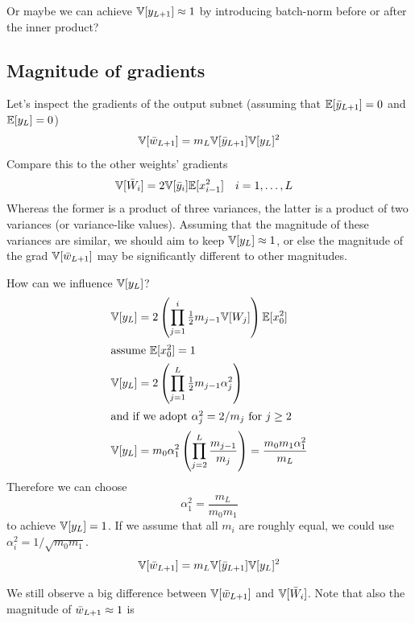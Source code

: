 Or maybe we can achieve $\mathbb{V}[y_{L+1}] \approx 1$ by introducing batch-norm before or after the inner product?


\clearpage

\subsection{Magnitude of gradients}

Let's inspect the gradients of the output subnet (assuming that $\mathbb{E}[\bar{y}_{L+1}] = 0$ and $\mathbb{E}[y_{L}] = 0$)
\begin{align}
\mathbb{V}[\bar{w}_{L+1}] = m_{L} \mathbb{V}[\bar{y}_{L+1}] \mathbb{V}[y_{L}]^{2}
\end{align}
Compare this to the other weights' gradients
\begin{align}
\mathbb{V}[\bar{W}_{i}] & = 2 \mathbb{V}[\bar{y}_{i}] \mathbb{E}[x_{i - 1}^2] && i = 1, \dots, L
\end{align}
Whereas the former is a product of three variances, the latter is a product of two variances (or variance-like values).
Assuming that the magnitude of these variances are similar, we should aim to keep $\mathbb{V}[y_{L}] \approx 1$, or else the magnitude of the grad $\mathbb{V}[\bar{w}_{L+1}]$ may be significantly different to other magnitudes.

How can we influence $\mathbb{V}[y_{L}]$?
\begin{align}
\mathbb{V}[y_{L}] & = 2 \left(\prod_{j = 1}^{i} \tfrac{1}{2} m_{j - 1} \mathbb{V}[W_{j}]\right) \mathbb{E}[x_{0}^2] \\
\intertext{assume $\mathbb{E}[x_{0}^2] = 1$}
\mathbb{V}[y_{L}] & = 2 \left(\prod_{j = 1}^{L} \tfrac{1}{2} m_{j - 1} \alpha_{j}^2\right) \\
\intertext{and if we adopt $\alpha_{j}^2 = 2/m_{j}$ for $j \ge 2$}
\mathbb{V}[y_{L}] & = m_{0} \alpha_{1}^2 \left(\prod_{j = 2}^{L} \frac{m_{j-1}}{m_{j}} \right)
  = \frac{m_{0} m_{1} \alpha_{1}^2}{m_{L}}
\end{align}
Therefore we can choose
\begin{equation}
\alpha_{1}^2 = \frac{m_{L}}{m_{0} m_{1}}
\end{equation}
to achieve $\mathbb{V}[y_{L}] = 1$.
If we assume that all $m_{i}$ are roughly equal, we could use $\alpha_{i}^2 = 1 / \sqrt{m_{0} m_{1}}$.
\begin{align}
\mathbb{V}[\bar{w}_{L+1}] = m_{L} \mathbb{V}[\bar{y}_{L+1}] \mathbb{V}[y_{L}]^{2}
\end{align}

We still observe a big difference between $\mathbb{V}[\bar{w}_{L+1}]$ and $\mathbb{V}[\bar{W}_{i}]$.
Note that also the magnitude of $\bar{w}_{L+1} \approx 1$ is 

